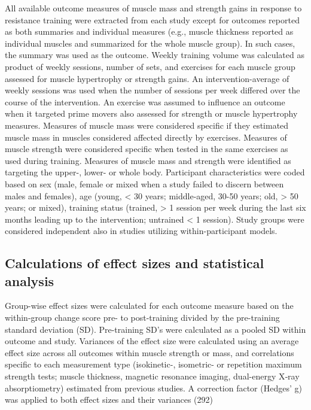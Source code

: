 \documentclass[twoside,10pt]{gihclass} %
\begin{document}
All available outcome measures of muscle mass and strength gains in
response to resistance training were extracted from each study except for outcomes reported as both summaries and individual measures (e.g., muscle thickness reported as individual muscles and summarized for the whole muscle group). In such cases, the summary was used as the outcome. Weekly training volume was calculated as product of weekly sessions, number of sets, and exercises for each muscle group assessed for muscle hypertrophy or strength gains. An intervention-average of weekly sessions was used when the number of sessions per week differed over the course of the intervention. An exercise was assumed to influence an outcome when it targeted prime movers also assessed for strength or muscle hypertrophy measures.
Measures of muscle mass were considered specific if they estimated muscle mass in muscles considered affected directly by exercises. Measures of muscle strength were considered specific when tested in the same exercises as used during training. Measures of muscle mass and strength were identified as targeting the upper-, lower- or whole body.
Participant characteristics were coded based on sex (male, female or mixed when a study failed to discern between males and females), age (young, \textless{} 30 years; middle-aged, 30-50 years; old, \textgreater{} 50 years; or mixed), training status (trained, \textgreater{} 1 session per week during the last six months leading up to the intervention; untrained \textless{} 1 session). Study groups were considered independent also in studies utilizing within-participant models.

\hypertarget{calculations-of-effect-sizes-and-statistical-analysis}{%
\subsection{Calculations of effect sizes and statistical analysis}\label{calculations-of-effect-sizes-and-statistical-analysis}}

Group-wise effect sizes were calculated for each outcome measure based
on the within-group change score pre- to post-training divided by the
pre-training standard deviation (SD). Pre-training SD's were calculated
as a pooled SD within outcome and study. Variances of the effect size
were calculated using an average effect size across all outcomes within
muscle strength or mass, and correlations specific to each measurement
type (isokinetic-, isometric- or repetition maximum strength tests;
muscle thickness, magnetic resonance imaging, dual-energy X‐ray
absorptiometry) estimated from previous studies.
A correction factor (Hedges' g) was applied to both effect sizes and their
variances
(292)
\end{document}
